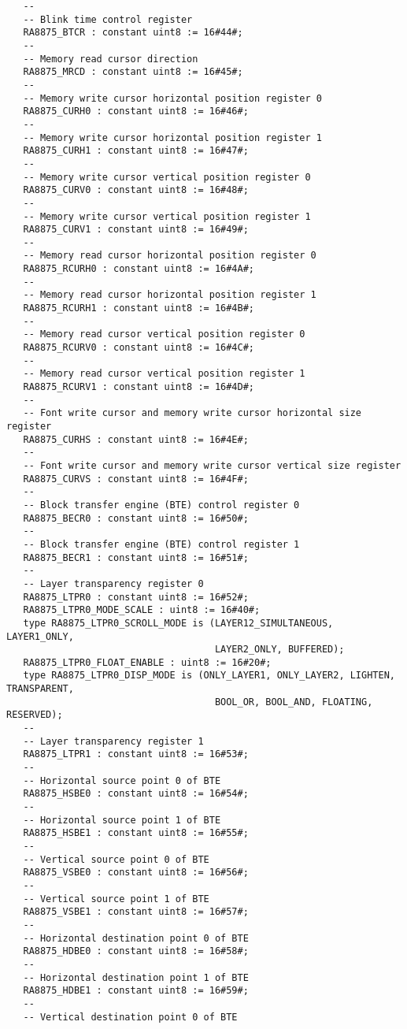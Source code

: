 \documentclass[10pt, openany]{book}
\begin{document}
\begin{lstlisting}
   --
   -- Blink time control register
   RA8875_BTCR : constant uint8 := 16#44#;
   --
   -- Memory read cursor direction
   RA8875_MRCD : constant uint8 := 16#45#;
   --
   -- Memory write cursor horizontal position register 0
   RA8875_CURH0 : constant uint8 := 16#46#;
   --
   -- Memory write cursor horizontal position register 1
   RA8875_CURH1 : constant uint8 := 16#47#;
   --
   -- Memory write cursor vertical position register 0
   RA8875_CURV0 : constant uint8 := 16#48#;
   --
   -- Memory write cursor vertical position register 1
   RA8875_CURV1 : constant uint8 := 16#49#;
   --
   -- Memory read cursor horizontal position register 0
   RA8875_RCURH0 : constant uint8 := 16#4A#;
   --
   -- Memory read cursor horizontal position register 1
   RA8875_RCURH1 : constant uint8 := 16#4B#;
   --
   -- Memory read cursor vertical position register 0
   RA8875_RCURV0 : constant uint8 := 16#4C#;
   --
   -- Memory read cursor vertical position register 1
   RA8875_RCURV1 : constant uint8 := 16#4D#;
   --
   -- Font write cursor and memory write cursor horizontal size register
   RA8875_CURHS : constant uint8 := 16#4E#;
   --
   -- Font write cursor and memory write cursor vertical size register
   RA8875_CURVS : constant uint8 := 16#4F#;
   --
   -- Block transfer engine (BTE) control register 0
   RA8875_BECR0 : constant uint8 := 16#50#;
   --
   -- Block transfer engine (BTE) control register 1
   RA8875_BECR1 : constant uint8 := 16#51#;
   --
   -- Layer transparency register 0
   RA8875_LTPR0 : constant uint8 := 16#52#;
   RA8875_LTPR0_MODE_SCALE : uint8 := 16#40#;
   type RA8875_LTPR0_SCROLL_MODE is (LAYER12_SIMULTANEOUS, LAYER1_ONLY,
                                     LAYER2_ONLY, BUFFERED);
   RA8875_LTPR0_FLOAT_ENABLE : uint8 := 16#20#;
   type RA8875_LTPR0_DISP_MODE is (ONLY_LAYER1, ONLY_LAYER2, LIGHTEN, TRANSPARENT,
                                     BOOL_OR, BOOL_AND, FLOATING, RESERVED);
   --
   -- Layer transparency register 1
   RA8875_LTPR1 : constant uint8 := 16#53#;
   --
   -- Horizontal source point 0 of BTE
   RA8875_HSBE0 : constant uint8 := 16#54#;
   --
   -- Horizontal source point 1 of BTE
   RA8875_HSBE1 : constant uint8 := 16#55#;
   --
   -- Vertical source point 0 of BTE
   RA8875_VSBE0 : constant uint8 := 16#56#;
   --
   -- Vertical source point 1 of BTE
   RA8875_VSBE1 : constant uint8 := 16#57#;
   --
   -- Horizontal destination point 0 of BTE
   RA8875_HDBE0 : constant uint8 := 16#58#;
   --
   -- Horizontal destination point 1 of BTE
   RA8875_HDBE1 : constant uint8 := 16#59#;
   --
   -- Vertical destination point 0 of BTE

\end{lstlisting}
\end{document}

